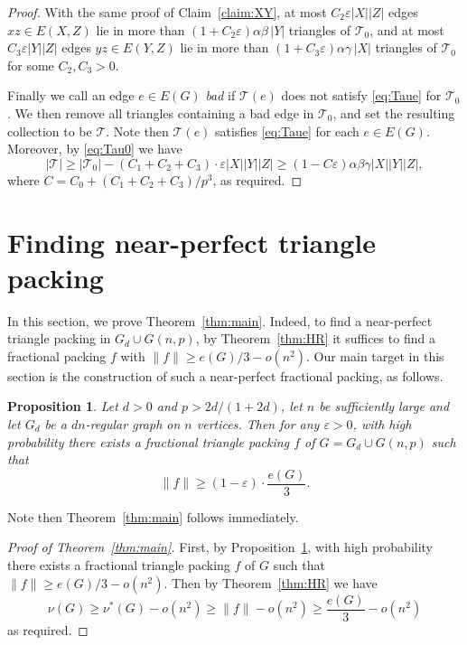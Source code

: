 \documentclass[11pt,reqno]{amsart}
\newtheorem{proposition}[theorem]{Proposition}
\theoremstyle{definition}
\theoremstyle{remark}
\newcommand\dT{\mathcal{T}}
\renewcommand\geq{\geqslant}
\renewcommand\ge{\geqslant}
\begin{document}
\begin{proof}
With the same proof of Claim~\ref{claim:XY}, at most $C_2\varepsilon|X||Z|$ edges $xz\in E(X,Z)$ lie in more than $(1+C_2\varepsilon)\alpha\beta\,|Y|$ triangles of $\mathcal T_0$, and at most $C_3\varepsilon|Y||Z|$ edges $yz\in E(Y,Z)$ lie in more than $(1+C_3\varepsilon)\alpha\gamma\,|X|$ triangles of $\mathcal T_0$ for some $C_2,C_3>0$. 

Finally we call an edge $e\in E(G)$ \emph{bad} if $\dT(e)$ does not satisfy \eqref{eq:Taue} for $\dT_0$. We then remove all triangles containing a bad edge in $\dT_0$, and set the resulting collection to be $\dT$. Note then $\dT(e)$ satisfies \eqref{eq:Taue} for each $e\in E(G)$. Moreover, by \eqref{eq:Tau0} we have
$$|\mathcal T|\ge |\mathcal T_0|-(C_1+C_2+C_3)\cdot \varepsilon|X||Y||Z|
\ge (1-C\varepsilon)\alpha\beta\gamma |X||Y||Z|,$$
where $C=C_0+(C_1+C_2+C_3)/p^3$, as required.
\end{proof}






\medskip




 
 


\section{Finding near-perfect triangle packing}\label{sec:main}

In this section, we prove Theorem~\ref{thm:main}. Indeed, to find a near-perfect triangle packing in $G_d\cup G(n,p)$,  by Theorem~\ref{thm:HR} it suffices to find a fractional packing $f$ with $\|f\|\geq e(G)/3-o(n^2)$. Our main target in this section is the construction of such a near-perfect fractional packing, as follows.

\begin{proposition}\label{prop:fractionalpacking}
Let $d>0$ and $p> 2d/(1+2d)$, let $n$ be sufficiently large and let $G_d$ be a $dn$-regular graph on $n$ vertices. Then for any $\varepsilon>0$, with high probability there exists a fractional triangle packing $f$ of $G=G_d\cup G(n,p)$ such that
$$\|f\|\ge (1-\varepsilon)\cdot \frac{e(G)}{3}.$$
\end{proposition}

Note then Theorem~\ref{thm:main} follows immediately. 

\begin{proof}[Proof of Theorem~\ref{thm:main}]
First, by Proposition~\ref{prop:fractionalpacking}, with high probability there exists a fractional triangle packing $f$ of $G$ such that $\|f\|\ge e(G)/3-o(n^2)$. Then by Theorem~\ref{thm:HR} we have
$$\nu(G)\geq \nu^*(G)- o(n^2)\geq \|f\|-o(n^2)\geq \frac{e(G)}{3} -o(n^2)$$
as required.
\end{proof}
\end{document}
